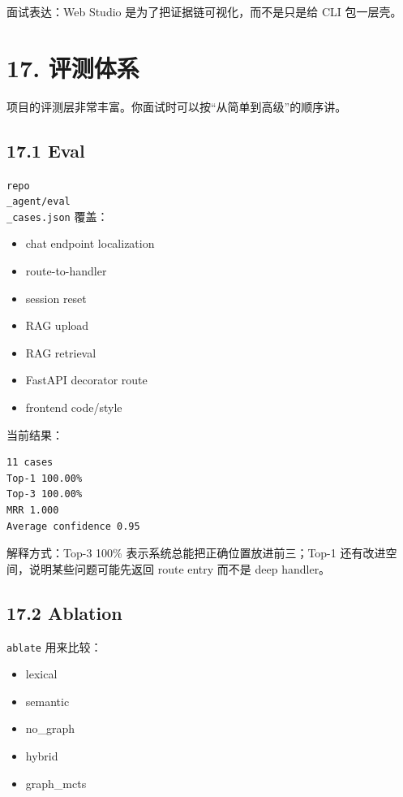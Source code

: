 \documentclass[UTF8,12pt,openany]{ctexbook}
\begin{document}
面试表达：Web Studio 是为了把证据链可视化，而不是只是给 CLI 包一层壳。\par

\section{17. 评测体系}

项目的评测层非常丰富。你面试时可以按“从简单到高级”的顺序讲。\par

\subsection{17.1 Eval}

\texttt{repo\\_agent/eval\\_cases.json} 覆盖：\par

\begin{itemize}
\item chat endpoint localization
\item route-to-handler
\item session reset
\item RAG upload
\item RAG retrieval
\item FastAPI decorator route
\item frontend code/style
\end{itemize}

当前结果：\par

\begin{lstlisting}
11 cases
Top-1 100.00%
Top-3 100.00%
MRR 1.000
Average confidence 0.95
\end{lstlisting}

解释方式：Top-3 100\% 表示系统总能把正确位置放进前三；Top-1 还有改进空间，说明某些问题可能先返回 route entry 而不是 deep handler。\par

\subsection{17.2 Ablation}

\texttt{ablate} 用来比较：\par

\begin{itemize}
\item lexical
\item semantic
\item no\_graph
\item hybrid
\item graph\_mcts
\end{itemize}
\end{document}
